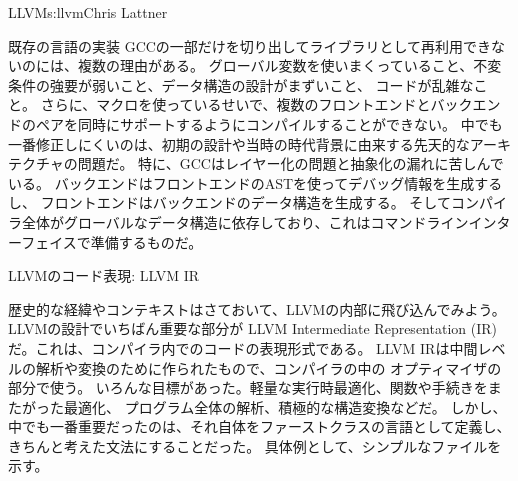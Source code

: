 \begin{aosachapter}{LLVM}{s:llvm}{Chris Lattner}
\begin{aosasect1}{既存の言語の実装}
GCCの一部だけを切り出してライブラリとして再利用できないのには、複数の理由がある。
グローバル変数を使いまくっていること、不変条件の強要が弱いこと、データ構造の設計がまずいこと、
コードが乱雑なこと。
さらに、マクロを使っているせいで、複数のフロントエンドとバックエンドのペアを同時にサポートするようにコンパイルすることができない。
中でも一番修正しにくいのは、初期の設計や当時の時代背景に由来する先天的なアーキテクチャの問題だ。
特に、GCCはレイヤー化の問題と抽象化の漏れに苦しんでいる。
バックエンドはフロントエンドのASTを使ってデバッグ情報を生成するし、
フロントエンドはバックエンドのデータ構造を生成する。
そしてコンパイラ全体がグローバルなデータ構造に依存しており、これはコマンドラインインターフェイスで準備するものだ。

\end{aosasect1}

\begin{aosasect1}{LLVMのコード表現: LLVM IR}

歴史的な経緯やコンテキストはさておいて、LLVMの内部に飛び込んでみよう。
LLVMの設計でいちばん重要な部分が
LLVM Intermediate Representation (IR)だ。これは、コンパイラ内でのコードの表現形式である。
LLVM IRは中間レベルの解析や変換のために作られたもので、コンパイラの中の
オプティマイザの部分で使う。
いろんな目標があった。軽量な実行時最適化、関数や手続きをまたがった最適化、
プログラム全体の解析、積極的な構造変換などだ。
しかし、中でも一番重要だったのは、それ自体をファーストクラスの言語として定義し、
きちんと考えた文法にすることだった。
具体例として、シンプルなファイルを示す。


\end{aosasect1}
\end{aosachapter}
